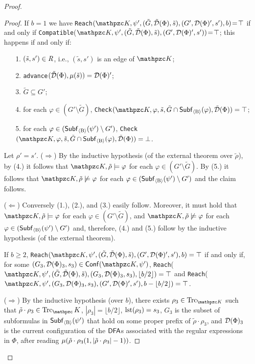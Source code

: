 \begin{proof}
\begin{proof}
    If $b\!=\!1$ we have \texttt{Reach}$(\Ku,\psi',(\tilde{G},\tilde{\Du}(\Phi),\tilde{s}),(G',\Du(\Phi)',s'),b)\!=\!\top$ if and only if  \texttt{Compatible}($\Ku,\psi',\allowbreak (\tilde{G},\tilde{\Du}(\Phi),\tilde{s}),(G',\Du(\Phi)',s'))\!=\!\top$; this happens if and only if: \begin{enumerate}
        \item[1.] $(\tilde{s},s')\in \textit{R}$, i.e., $(\tilde{s},s')$ is an edge of $\Ku$;
        \item[2.] \texttt{advance}$(\tilde{\mathcal{D}}(\Phi),\mu(\tilde{s}))=\mathcal{D}(\Phi)'$;
        \item[3.] $\tilde{G}\subseteq G'$;
        \item[4.] for each $\varphi\in(G'\setminus \tilde{G})$, \texttt{Check}$(\Ku,\varphi,\tilde{s},\tilde{G}\cap \subfB(\varphi),\tilde{\Du}(\Phi))=\top$;
        \item[5.] for each $\varphi\in(\mathsf{Subf}_{\operatorname{\langle B\rangle}}(\psi')\setminus G')$, \texttt{Check}$(\Ku,\varphi,\tilde{s},\tilde{G}\cap \subfB(\varphi),\tilde{\Du}(\Phi))=\bot$.
    \end{enumerate}
    Let $\rho'=s'$. ($\Rightarrow$)
    By the inductive hypothesis (of the external theorem over $\tilde{\rho}$), by (4.) it follows that $\Ku,\tilde{\rho}\models\varphi$ for each $\varphi\in(G'\setminus \tilde{G})$. By (5.) it follows that $\Ku,\tilde{\rho}\not\models\varphi$ for each  $\varphi\in(\mathsf{Subf}_{\operatorname{\langle B\rangle}}(\psi')\setminus G')$ and the claim follows.

     ($\Leftarrow$) Conversely (1.), (2.), and (3.) easily follow. Moreover, it must hold that $\Ku,\tilde{\rho}\models\varphi$ for each $\varphi\in (G'\setminus \tilde{G})$, and $\Ku,\tilde{\rho}\not\models\varphi$ for each  $\varphi\in (\mathsf{Subf}_{\operatorname{\langle B\rangle}}(\psi')\setminus G')$ and, therefore, (4.) and (5.) follow by the inductive hypothesis (of the external theorem).
    
    If $b\geq 2$, \texttt{Reach}$(\Ku,\psi',(\tilde{G},\tilde{\Du}(\Phi),\tilde{s}),(G',\Du(\Phi)',s'),b)=\top$ if and only if, for some $(G_3,\Du(\Phi)_3,s_3)\in\conf(\Ku,\psi')$,  \texttt{Reach}($\Ku,\psi',(\tilde{G},\tilde{\Du}(\Phi),\tilde{s}),(G_3,\Du(\Phi)_3,s_3), \linebreak \lfloor b/2\rfloor)=\top$ and  \texttt{Reach}($\Ku,\psi',(G_3,\Du(\Phi)_3,s_3),(G',\Du(\Phi)',s'),b-\lfloor b/2\rfloor)=\top$.
    
    ($\Rightarrow$) By the inductive hypothesis (over $b$), there exists $\rho_3\in\Trk_{\Ku}$ such that $\tilde{\rho}\cdot\rho_3\in\Trk_\Ku$, $|\rho_3|=\lfloor b/2\rfloor$, $\operatorname{lst}(\rho_3)=s_3$, $G_3$ is the subset of subformulas in $\mathsf{Subf}_{\operatorname{\langle B\rangle}}(\psi')$ that hold on some proper prefix of $\tilde{\rho}\cdot\rho_3$, and $\mathcal{D}(\Phi)_3$ is the current configuration of the $\text{\sffamily DFA}$s associated with the regular expressions in $\Phi$, after reading $\mu(\tilde{\rho}\cdot\rho_3(1,|\tilde{\rho}\cdot\rho_3|-1))$.
    

\end{proof}
\end{proof}
